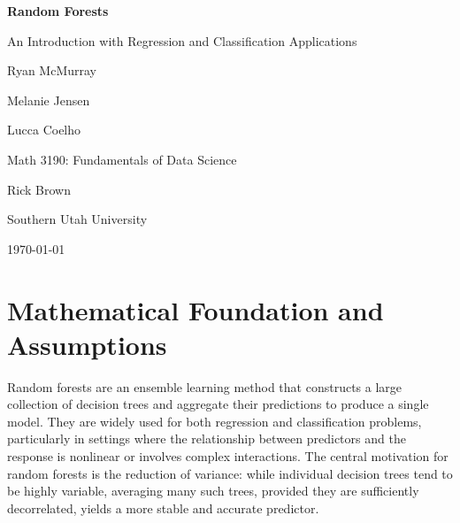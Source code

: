 \documentclass[
  11pt,
  letterpaper,
]{article}
\author{}
\date{}
\begin{document}
\begin{titlepage}
\centering
\vspace*{2.5cm}

{\LARGE \textbf{Random Forests}\par}
\vspace{0.5cm}
{\large An Introduction with Regression and Classification Applications\par}

\vspace{3cm}

{\large Ryan McMurray\par}
\vspace{0.2cm}
{\large Melanie Jensen\par}
\vspace{0.2cm}
{\large Lucca Coelho\par}

{\large Math 3190: Fundamentals of Data Science\par}
\vspace{0.3cm}
{\large Rick Brown\par}
\vspace{0.3cm}
{\large Southern Utah University\par}

{\large \today\par}

\end{titlepage}

\newpage

\section{Mathematical Foundation and
Assumptions}\label{mathematical-foundation-and-assumptions}

Random forests are an ensemble learning method that constructs a large
collection of decision trees and aggregate their predictions to produce
a single model. They are widely used for both regression and
classification problems, particularly in settings where the relationship
between predictors and the response is nonlinear or involves complex
interactions. The central motivation for random forests is the reduction
of variance: while individual decision trees tend to be highly variable,
averaging many such trees, provided they are sufficiently decorrelated,
yields a more stable and accurate predictor.
\end{document}
